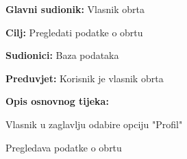 				\noindent {}
					\begin{packed_item}
	
						\item \textbf{Glavni sudionik: } Vlasnik obrta
						\item \textbf{Cilj:} Pregledati podatke o obrtu
						\item \textbf{Sudionici:} Baza podataka
						\item \textbf{Preduvjet:} Korisnik je vlasnik obrta
						\item \textbf{Opis osnovnog tijeka:}
						
						\item[] \begin{packed_enum}
	
							\item Vlasnik u zaglavlju odabire opciju "Profil"
							\item Pregledava podatke o obrtu
						
						\end{packed_enum}
					\end{packed_item}
				
